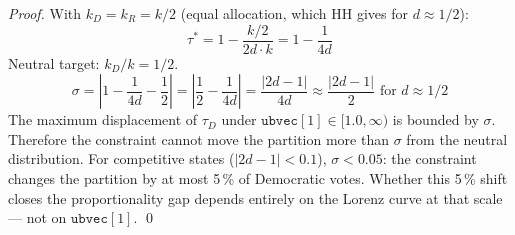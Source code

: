 \begin{proof}
With $k_D = k_R = k/2$ (equal allocation, which HH gives for $d \approx 1/2$):
\[
  \tau^* = 1 - \frac{k/2}{2d \cdot k} = 1 - \frac{1}{4d}
\]
Neutral target: $k_D/k = 1/2$.
\[
  \sigma = \left|1 - \frac{1}{4d} - \frac{1}{2}\right| = \left|\frac{1}{2} - \frac{1}{4d}\right|
  = \frac{|2d-1|}{4d} \approx \frac{|2d-1|}{2} \text{ for } d \approx 1/2
\]
The maximum displacement of $\tau_D$ under $\mathtt{ubvec}[1] \in [1.0, \infty)$
is bounded by $\sigma$. Therefore the constraint cannot move the partition more
than $\sigma$ from the neutral distribution.
For competitive states ($|2d-1| < 0.1$), $\sigma < 0.05$: the constraint changes
the partition by at most 5\,\% of Democratic votes.
Whether this 5\,\% shift closes the proportionality gap depends entirely on the
Lorenz curve at that scale --- not on $\mathtt{ubvec}[1]$. \qed
\end{proof}

